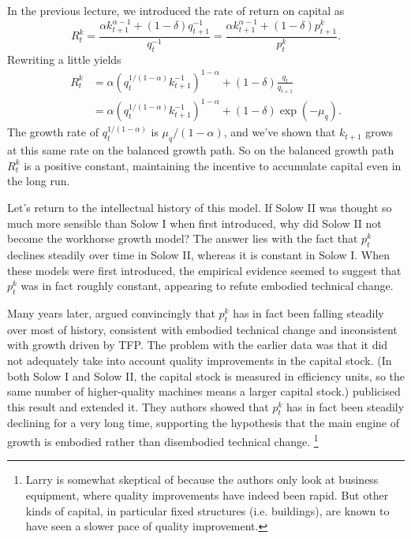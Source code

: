 \documentclass[11pt,letterpaper,reqno,oneside]{article}
\begin{document}
In the previous lecture, we introduced the rate of return on capital as
%
\begin{equation*}
	R^k_t
	= \frac{ \alpha k_{t+1}^{\alpha-1} + (1-\delta) q_{t+1}^{-1} }
	{ q_t^{-1} }
	= \frac{ \alpha k_{t+1}^{\alpha-1} + (1-\delta) p^k_{t+1} }
	{ p^k_t } .
\end{equation*}
%
Rewriting a little yields
%
\begin{align*}
	R^k_t
	&= \alpha \left( q_t^{1/(1-\alpha)} k_{t+1}^{-1} \right)^{1-\alpha} 
	+ (1-\delta) \frac{q_t}{q_{t+1}}
	\\
	&= \alpha \left( q_t^{1/(1-\alpha)} k_{t+1}^{-1} \right)^{1-\alpha} 
	+ (1-\delta) \exp(-\mu_q) .
\end{align*}
%
The growth rate of $q_t^{1/(1-\alpha)}$ is $\mu_q / (1-\alpha)$, and we've shown that $k_{t+1}$ grows at this same rate on the balanced growth path. So on the balanced growth path $R^k_t$ is a positive constant, maintaining the incentive to accumulate capital even in the long run.


Let's return to the intellectual history of this model. If Solow II was thought so much more sensible than Solow I when first introduced, why did Solow II not become the workhorse growth model? The answer lies with the fact that $p^k_t$ declines steadily over time in Solow II, whereas it is constant in Solow I. When these models were first introduced, the empirical evidence seemed to suggest that $p^k_t$ was in fact roughly constant, appearing to refute embodied technical change.

Many years later, \textcite{Gordon1990} argued convincingly that $p^k_t$ has in fact been falling steadily over most of history, consistent with embodied technical change and inconsistent with growth driven by TFP. The problem with the earlier data was that it did not adequately take into account quality improvements in the capital stock. (In both Solow I and Solow II, the capital stock is measured in efficiency units, so the same number of higher-quality machines means a larger capital stock.) \textcite{GreenwoodHercowitzKrusell1997} publicised this result and extended it. They authors showed that $p^k_t$ has in fact been steadily declining for a very long time, supporting the hypothesis that the main engine of growth is embodied rather than disembodied technical change.%
	\footnote{Larry is somewhat skeptical of \textcite{GreenwoodHercowitzKrusell1997} because the authors only look at business equipment, where quality improvements have indeed been rapid. But other kinds of capital, in particular fixed structures (i.e. buildings), are known to have seen a slower pace of quality improvement.}
\end{document}

